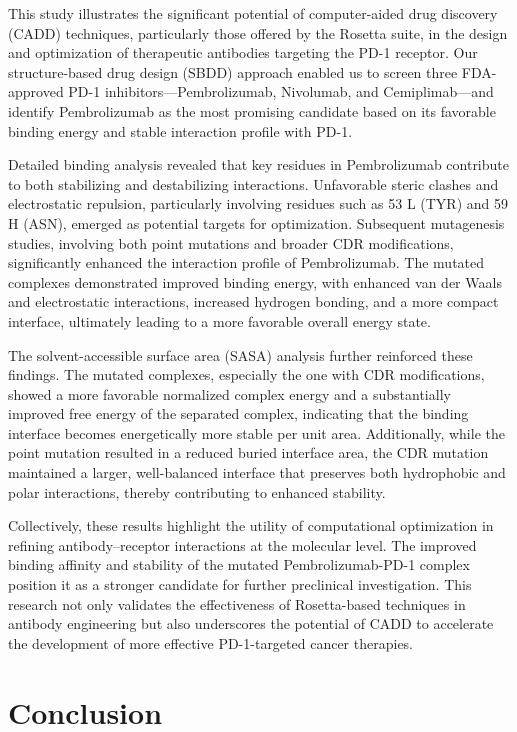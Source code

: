 \documentclass[11pt]{article}
\begin{document}
This study illustrates the significant potential of computer-aided drug discovery (CADD) techniques, particularly those offered by the Rosetta suite, in the design and optimization of therapeutic antibodies targeting the PD-1 receptor. Our structure-based drug design (SBDD) approach enabled us to screen three FDA-approved PD-1 inhibitors—Pembrolizumab, Nivolumab, and Cemiplimab—and identify Pembrolizumab as the most promising candidate based on its favorable binding energy and stable interaction profile with PD-1.

Detailed binding analysis revealed that key residues in Pembrolizumab contribute to both stabilizing and destabilizing interactions. Unfavorable steric clashes and electrostatic repulsion, particularly involving residues such as 53 L (TYR) and 59 H (ASN), emerged as potential targets for optimization. Subsequent mutagenesis studies, involving both point mutations and broader CDR modifications, significantly enhanced the interaction profile of Pembrolizumab. The mutated complexes demonstrated improved binding energy, with enhanced van der Waals and electrostatic interactions, increased hydrogen bonding, and a more compact interface, ultimately leading to a more favorable overall energy state.

The solvent-accessible surface area (SASA) analysis further reinforced these findings. The mutated complexes, especially the one with CDR modifications, showed a more favorable normalized complex energy and a substantially improved free energy of the separated complex, indicating that the binding interface becomes energetically more stable per unit area. Additionally, while the point mutation resulted in a reduced buried interface area, the CDR mutation maintained a larger, well-balanced interface that preserves both hydrophobic and polar interactions, thereby contributing to enhanced stability.

Collectively, these results highlight the utility of computational optimization in refining antibody–receptor interactions at the molecular level. The improved binding affinity and stability of the mutated Pembrolizumab-PD-1 complex position it as a stronger candidate for further preclinical investigation. This research not only validates the effectiveness of Rosetta-based techniques in antibody engineering but also underscores the potential of CADD to accelerate the development of more effective PD-1-targeted cancer therapies.

\section{Conclusion}
\end{document}
